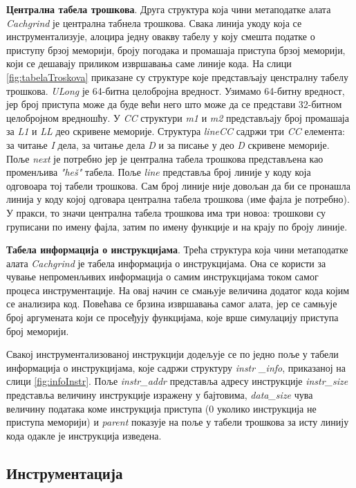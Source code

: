 \documentclass[12pt,oneside]{memoir}
\begin{document}
\indent \textbf{Централна табела трошкова}. Друга структура која чини метаподатке алата \textit{Cachgrind} је централна табнела трошкова. Свака линија укоду која се инструментализује, алоцира једну овакву табелу у коју смешта податке о приступу брзој меморији, броју погодака и промашаја приступа брзој меморији, који се дешавају приликом извршавања саме линије кода. На слици \ref{fig:tabelaTroskova} приказане су структуре које представљају ценстралну табелу трошкова. \textit{ULong} је 64-битна целобројна вредност. Узимамо 64-битну вредност, јер број приступа може да буде већи него што може да се представи 32-битном целобројном вредношћу. У \textit{CC} структури \textit{m1} и \textit{m2} представљају број промашаја за \textit{L1} и \textit{LL} део скривене меморије. Структура \textit{lineCC} садржи три \textit{CC} елемента: за читање \textit{I} дела, за читање дела \textit{D} и за писање у део \textit{D} скривене меморије. Поље \textit{next} је потребно јер је централна табела трошкова представљена као променљива \textit{"heš"} табела. Поље \textit{line} представља број линије у коду која одговоара тој табели трошкова. Сам број линије није довољан да би се пронашла линија у коду којој одговара централна табела трошкова (име фајла је потребно). У пракси, то значи централна табела трошкова има три новоа: трошкови су груписани по имену фајла, затим по имену функције и на крају по броју линије.


\indent \textbf{Табела информација о инструкцијама}. Трећа структура која чини метаподатке алата \textit{Cachgrind} је табела информација о инструкцијама. Она се користи за чување непроменљивих информација о самим инструкцијама током самог процеса инструментације. На овај начин се смањује величина додатог кода којим се анализира код. Повећава се брзина извршавања самог алата, јер се самњује број аргумената који се просеђују функцијама, које врше симулацију приступа број меморији.


\indent Свакој инструментализованој инструкцији додељује се по једно поље у табели информација о инструкцијама, које садржи структуру \textit{instr \_info},  приказаној на слици \ref{fig:infoInstr}. Поље \textit{instr\_addr} представља адресу инструкције \textit{instr\_size} представља величину инструкције изражену у бајтовима, \textit{data\_size} чува величину података коме инструкција приступа (0 уколико инструкција не приступа меморији) и \textit{parent} показује на поље у табели трошкова за исту линију кода одакле је инструкција изведена.

\subsection{Инструментација}
\end{document}
